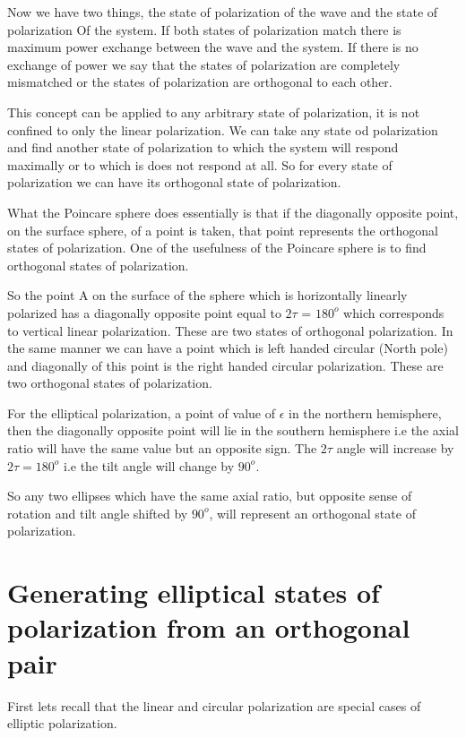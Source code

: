 	Now we have two things, the state of polarization of the wave and the state of polarization Of the system. If both states of polarization match there is maximum power exchange between the wave and the system. If there is no exchange of power we say that the states of polarization are completely mismatched or the states of polarization are orthogonal to each other.
	
	This concept can be applied to any arbitrary state of polarization, it is not confined to only the linear polarization. We can take any state od polarization and find another state of polarization to which the system will respond maximally or to which is does not respond at all. So for every state of polarization we can have its orthogonal state of polarization. 
	
	What the Poincare sphere does essentially is that if the diagonally opposite point, on the surface sphere, of a point is taken, that point represents the orthogonal states of polarization. One of the usefulness of the Poincare sphere is to find orthogonal states of polarization.
	
	So the point A on the surface of the sphere which is horizontally linearly polarized has a diagonally opposite point equal to $2\tau$ = $180^{o}$ which corresponds to vertical linear polarization. These are two states of orthogonal polarization. In the same manner we can have a point which is left handed circular (North pole) and diagonally of this point is the right handed circular polarization. These are two orthogonal states of polarization.
	
	For the elliptical polarization, a point of value of $\epsilon$ in the northern hemisphere, then the diagonally opposite point will lie in the southern hemisphere i.e the axial ratio   will have the same value but an opposite sign. The $2\tau$ angle will increase by $2\tau = 180^{o}$ i.e the tilt angle will change by $90^{o}$.
	
	So any two ellipses which have the same axial ratio, but opposite sense of rotation and tilt angle shifted by $90^{o}$, will represent an orthogonal state of polarization.
	
	\section{Generating elliptical states of polarization from an orthogonal pair}
	
	First lets recall that the linear and circular polarization are special cases of elliptic polarization. 
	
